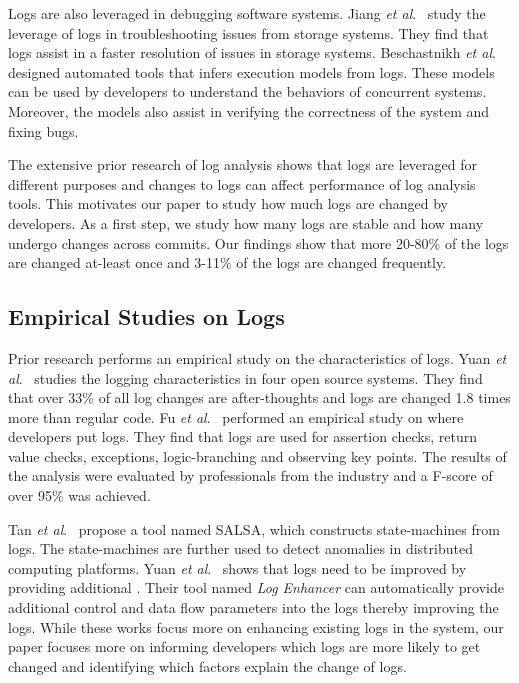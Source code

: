Logs are also leveraged in debugging software systems. Jiang \textsl{et al}$ . $~\cite{Jiang:2009:UCP:1525908.1525912} study the leverage of logs in troubleshooting issues from storage systems. They find that logs assist in a faster resolution of issues in storage systems. Beschastnikh \textsl{et al}$ . $~\cite{Beschastnikh:2011:LEI:2025113.2025151} designed automated tools that infers execution models from logs. These models can be used by developers to understand the behaviors of concurrent systems. Moreover, the models also assist in verifying the correctness of the system and fixing bugs.


The extensive prior research of log analysis shows that logs are leveraged for different purposes and changes to logs can affect performance  of log analysis tools. This motivates our paper to study how much logs are changed by developers. As a first step, we study how many logs are stable and how many undergo changes across commits. Our findings show that more 20-80\% of the logs are changed at-least once and 3-11\% of the logs are changed frequently. 


\subsection{Empirical Studies on Logs}


Prior research performs an empirical study on the characteristics of logs. Yuan \textsl{et al}$ . $~\cite{Characterizinglogs} studies the logging characteristics in four open source systems. They find that over 33\% of all log changes are after-thoughts and logs are changed 1.8 times more than regular code. Fu \textsl{et al$.$}~\cite{Fu1} performed an empirical study on where developers put logs. They find that logs are used for assertion checks, return value checks, exceptions, logic-branching and observing key points. The results of the analysis were evaluated by professionals from the industry and a F-score of over 95\% was achieved. 

Tan \textsl{et al}$ . $~\cite{TanSalsa} propose a tool named SALSA, which constructs state-machines from logs. The state-machines are further used to detect anomalies in distributed computing platforms. Yuan\textsl{ et al$ . $}~\cite{Yuan} shows that logs need to be improved by providing additional . Their tool named \emph{Log Enhancer} can automatically provide additional control and data flow parameters into the logs thereby improving the logs. While these works focus more on enhancing existing logs in the system, our paper focuses more on informing developers which logs are more likely to get changed and identifying which factors explain the change of logs. 


